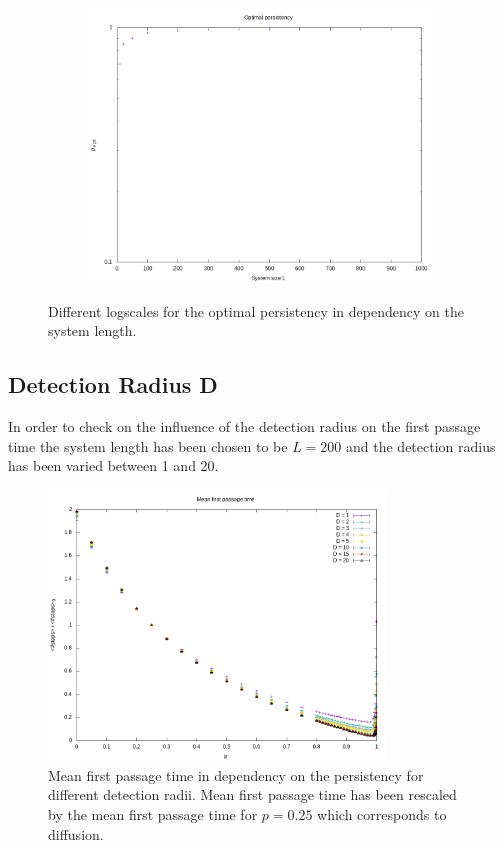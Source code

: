 \documentclass[]{scrartcl}
\begin{document}
\begin{figure}[!hbt]
\begin{subfigure}{0.35\textwidth}
 \includegraphics[width=\textwidth]{./fig/sysL/p_opt_logy.png}
\end{subfigure}
\caption{Different logscales for the optimal persistency in dependency on the system length.} 
\label{fig:sysL-p_opt-logscales}
\end{figure}


\subsection{Detection Radius D}
\label{ssec:detecR}

In order to check on the influence of the detection radius on the first passage time the system length has been chosen to be $L = 200$ and the detection radius has been varied between 1 and 20.

\begin{figure}[!hbt]
 \centering
 \includegraphics[width=0.8\textwidth]{./fig/detecR/fpt.png}
 \caption{Mean first passage time in dependency on the persistency for different detection radii. Mean first passage time has been rescaled by the mean first passage time for $p = 0.25$ which corresponds to diffusion.\label{fig:detecR-fpt}}
\end{figure}
\end{document}
